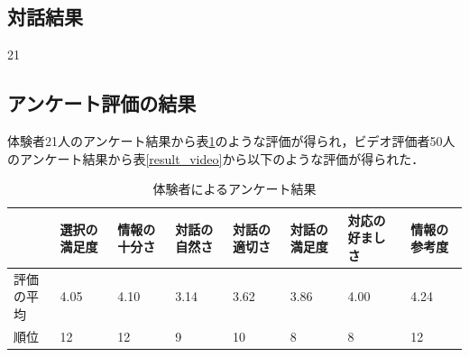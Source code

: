 \subsection{対話結果}
21

\subsection{アンケート評価の結果}
体験者21人のアンケート結果から表\ref{result_taiken}のような評価が得られ，ビデオ評価者50人のアンケート結果から表\ref{result_video}から以下のような評価が得られた．

\begin{table}[hbtp]
    \caption{体験者によるアンケート結果}
    \label{result_taiken}
    \centering
    \begin{tabular}{l|l|l|l|l|l|l|l}
    \hline
          & 選択の満足度 & 情報の十分さ & 対話の自然さ & 対話の適切さ & 対話の満足度 & 対応の好ましさ & 情報の参考度 \\ \hline
    評価の平均 & 4.05   & 4.10   & 3.14   & 3.62   & 3.86   & 4.00    & 4.24   \\ \hline
    順位    & 12     & 12     & 9      & 10     & 8      & 8       & 12     \\ \hline
    \end{tabular}
\end{table}


